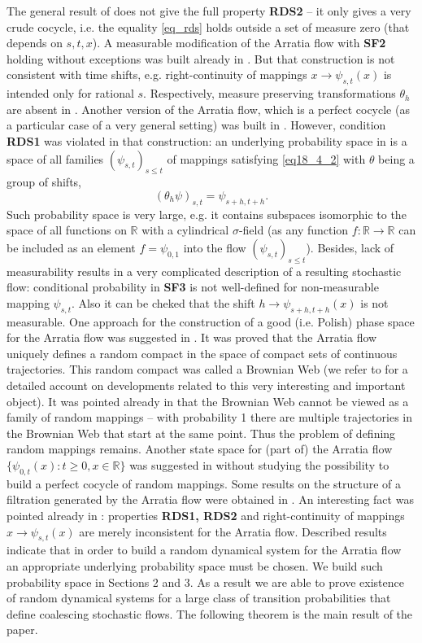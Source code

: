 \documentclass[a4paper,12pt]{article}
\newcommand{\1}{1\!\!\,{\rm I}}
\theoremstyle{plain}
\begin{document}
The general result of \cite{LJR} does not give the full property {\bf RDS2} -- it only gives a very crude cocycle, i.e. the equality \eqref{eq_rds} holds outside a set of measure zero (that depends on $s,t,x$). A measurable modification of the Arratia flow with {\bf SF2} holding without exceptions was built already in \cite{Arratia2}. But that construction is not consistent with time shifts, e.g. right-continuity of mappings $x\to \psi_{s,t}(x)$ is intended only for rational $s.$ Respectively, measure preserving transformations $\theta_h$ are absent in \cite{Arratia2}. Another version of the Arratia flow, which is a perfect cocycle (as a particular case of a very general setting) was built in \cite{Darling}. However, condition {\bf RDS1} was violated in that construction: an underlying probability space in \cite{Darling}  is a space of all families $(\psi_{s,t})_{s\leq t}$ of mappings satisfying \eqref{eq18_4_2} with $\theta$ being a group of shifts,
$$
(\theta_h\psi)_{s,t}=\psi_{s+h,t+h}.
$$
Such probability space is very large, e.g. it contains subspaces isomorphic to the space of all functions on $\mathbb{R}$ with a cylindrical $\sigma$-field (as any function $f:\mathbb{R}\to\mathbb{R}$ can be included as an element $f=\psi_{0,1}$ into the flow $(\psi_{s,t})_{s\leq t}$). Besides, lack of measurability results in a very complicated description of a resulting stochastic flow: conditional probability in {\bf SF3} is not well-defined for non-measurable mapping $\psi_{s,t}.$ Also it can be cheked that the shift $h\to \psi_{s+h,t+h}(x)$ is not measurable. One approach for the construction of a good (i.e. Polish) phase space for the Arratia flow was suggested in \cite{FINR}. It was proved that the Arratia flow uniquely defines a random compact in the space of compact sets of continuous trajectories. This random compact was called a Brownian Web (we refer to  \cite{SSS, BGS} for a detailed account on developments related to this very interesting and important object). It was pointed already in \cite{FINR} that the Brownian Web cannot be viewed as a family of random mappings -- with probability 1 there are multiple trajectories in the Brownian Web that start at the same point. Thus the problem of defining random mappings remains. Another state space for (part of) the Arratia flow $\{\psi_{0,t}(x):t\geq 0, x\in\mathbb{R}\}$ was suggested in \cite{D1, D2, DO} without studying the possibility to build a perfect cocycle of random mappings. Some results on the structure of a filtration generated by the Arratia flow were obtained in \cite{Riabov}. An interesting fact was pointed already in \cite{Arratia2}: properties {\bf RDS1, RDS2} and right-continuity of mappings $x\to \psi_{s,t}(x)$ are merely inconsistent for the Arratia flow. Described results indicate that in order to build a random dynamical system for the Arratia flow an appropriate underlying probability space must be chosen. We build such probability space in Sections 2 and 3. As a result we are able to prove existence of random dynamical systems for a large class of transition probabilities that define coalescing stochastic flows. The following theorem is the main result of the paper. 
\end{document}
